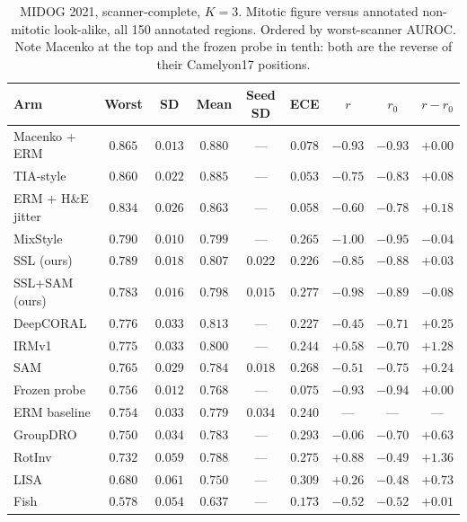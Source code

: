 \documentclass[10pt]{article} %
\begin{document}
\begin{table}[h]
\centering
\caption{MIDOG 2021, scanner-complete, $K=3$. Mitotic figure versus annotated
non-mitotic look-alike, all 150 annotated regions. Ordered by worst-scanner
AUROC. Note Macenko at the top and the frozen probe in tenth: both are the
reverse of their Camelyon17 positions.}
\label{tab:midog_full}
\small
\setlength{\tabcolsep}{4pt}
\begin{tabular}{lcccccccc}
\toprule
Arm & Worst & SD & Mean & Seed SD & ECE & $r$ & $r_0$ & $r-r_0$ \\
\midrule
Macenko + ERM       & $\mathbf{0.865}$ & $\mathbf{0.013}$ & $0.880$ & --- & $0.078$ & $-0.93$ & $-0.93$ & $+0.00$ \\
TIA-style           & $0.860$ & $0.022$ & $\mathbf{0.885}$ & --- & $\mathbf{0.053}$ & $-0.75$ & $-0.83$ & $+0.08$ \\
ERM + H\&E jitter   & $0.834$ & $0.026$ & $0.863$ & --- & $0.058$ & $-0.60$ & $-0.78$ & $+0.18$ \\
MixStyle            & $0.790$ & $0.010$ & $0.799$ & --- & $0.265$ & $-1.00$ & $-0.95$ & $-0.04$ \\
SSL (ours)          & $0.789$ & $0.018$ & $0.807$ & $0.022$ & $0.226$ & $-0.85$ & $-0.88$ & $+0.03$ \\
SSL+SAM (ours)      & $0.783$ & $0.016$ & $0.798$ & $0.015$ & $0.277$ & $-0.98$ & $-0.89$ & $-0.08$ \\
DeepCORAL           & $0.776$ & $0.033$ & $0.813$ & --- & $0.227$ & $-0.45$ & $-0.71$ & $+0.25$ \\
IRMv1               & $0.775$ & $0.033$ & $0.800$ & --- & $0.244$ & $+0.58$ & $-0.70$ & $+1.28$ \\
SAM                 & $0.765$ & $0.029$ & $0.784$ & $0.018$ & $0.268$ & $-0.51$ & $-0.75$ & $+0.24$ \\
Frozen probe        & $0.756$ & $0.012$ & $0.768$ & --- & $0.075$ & $-0.93$ & $-0.94$ & $+0.00$ \\
ERM baseline        & $0.754$ & $0.033$ & $0.779$ & $0.034$ & $0.240$ & --- & --- & --- \\
GroupDRO            & $0.750$ & $0.034$ & $0.783$ & --- & $0.293$ & $-0.06$ & $-0.70$ & $+0.63$ \\
RotInv              & $0.732$ & $0.059$ & $0.788$ & --- & $0.275$ & $+0.88$ & $-0.49$ & $+1.36$ \\
LISA                & $0.680$ & $0.061$ & $0.750$ & --- & $0.309$ & $+0.26$ & $-0.48$ & $+0.73$ \\
Fish                & $0.578$ & $0.054$ & $0.637$ & --- & $0.173$ & $-0.52$ & $-0.52$ & $+0.01$ \\
\bottomrule
\end{tabular}
\end{table}
\end{document}
